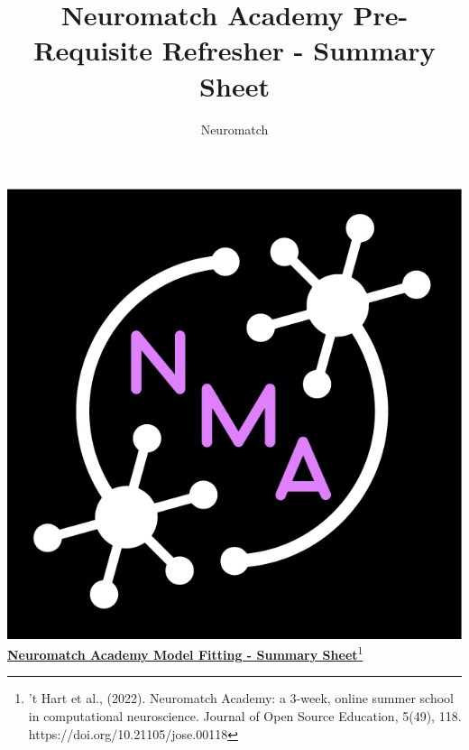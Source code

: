\documentclass[10pt,a4paper]{article}
\title{Neuromatch Academy Pre-Requisite Refresher - Summary Sheet}
\author{Neuromatch}
\begin{document}
\includegraphics[scale=0.1]{Figures/nma-logo-square-4xp.jpeg}\href{https://compneuro.neuromatch.io/tutorials/intro.html}{\textbf{\Huge{Neuromatch Academy Model Fitting - Summary Sheet}}\footnote{’t Hart et al., (2022). Neuromatch Academy: a 3-week, online summer school in computational neuroscience. Journal of Open Source Education, 5(49), 118. https://doi.org/10.21105/jose.00118}}
\small
\begin{multicols}{3}
\let\clearpage\relax

\end{multicols}
\newpage
\end{document}
